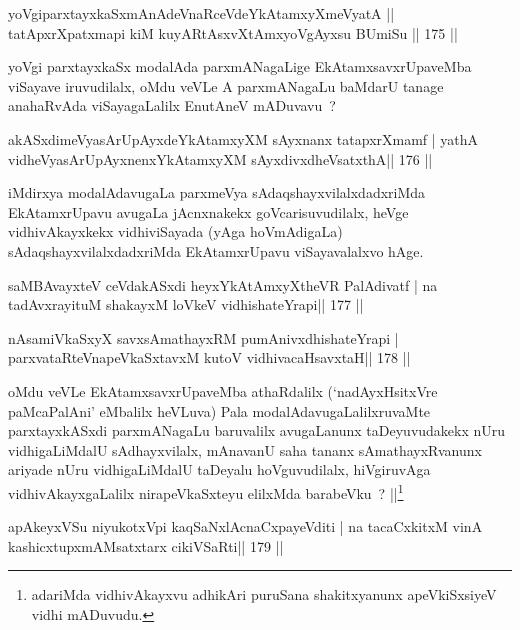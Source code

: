 \begin{shl}
yoVgiparxtayxkaSxmAnAdeVnaRceVdeYkAtamxyXmeVyatA ||
tatApxrXpatxmapi kiM kuyARtAsxvXtAmxyoVgAyxsu BUmiSu \hfill || 175 ||
\end{shl}

\begin{artha}
yoVgi parxtayxkaSx modalAda parxmANagaLige EkAtamxsavxrUpaveMba viSayave iruvudilalx, oMdu veVLe A parxmANagaLu baMdarU tanage anahaRvAda viSayagaLalilx EnutAneV mADuvavu~?
\end{artha}

\begin{shl}
akASxdimeVyasArUpAyxdeYkAtamxyXM sAyxnanx tatapxrXmamf |
yathA vidheVyasArUpAyxnenxYkAtamxyXM sAyxdivxdheVsatxthA\hfill || 176 ||
\end{shl}

\begin{artha}
iMdirxya modalAdavugaLa parxmeVya sAdaqshayxvilalxdadxriMda EkAtamxrUpavu avugaLa jAcnxnakekx goVcarisuvudilalx, heVge vidhivAkayxkekx vidhiviSayada (yAga hoVmAdigaLa) sAdaqshayxvilalxdadxriMda EkAtamxrUpavu viSayavalalxvo hAge.
\end{artha}

\begin{shl}
saMBAvayxteV ceVdakASxdi heyxYkAtAmxyXtheVR PalAdivatf |
na tadAvxrayituM shakayxM loVkeV vidhishateYrapi\hfill || 177 ||
\end{shl}

\begin{shl}
nAsamiVkaSxyX savxsAmathayxRM pumAnivxdhishateYrapi |
parxvataRteV\s napeVkaSxtavxM kutoV vidhivacaHsavxtaH\hfill || 178 ||
\end{shl}

\begin{artha}
oMdu veVLe EkAtamxsavxrUpaveMba athaRdalilx (`nadAyxHsitxVre paMcaPalAni'  eMbalilx heVLuva) Pala modalAdavugaLalilxruvaMte parxtayxkASxdi parxmANagaLu baruvalilx avugaLanunx taDeyuvudakekx nUru vidhigaLiMdalU sAdhayxvilalx, mAnavanU saha tananx sAmathayxRvanunx ariyade nUru vidhigaLiMdalU taDeyalu hoVguvudilalx, hiVgiruvAga vidhivAkayxgaLalilx nirapeVkaSxteyu elilxMda barabeVku~? ||\footnote[1]{adariMda vidhivAkayxvu adhikAri puruSana shakitxyanunx apeVkiSxsiyeV vidhi mADuvudu.}
\end{artha}


\begin{shl}
apAkeyxVSu niyukotxV\s pi kaqSaNxlAcnaCxpayeVditi |
na tacaCxkitxM vinA kashicxtupxmAMsatxtarx cikiVSaRti\hfill || 179 ||
\end{shl}

